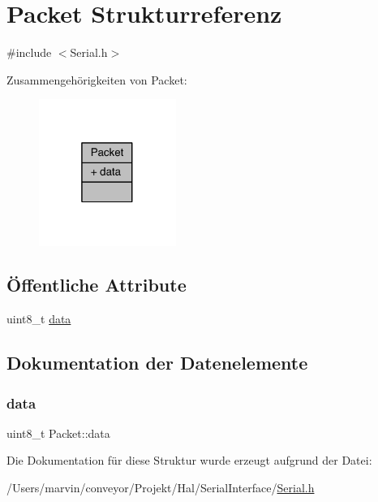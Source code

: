 \hypertarget{struct_packet}{}\section{Packet Strukturreferenz}
\label{struct_packet}


{\ttfamily \#include $<$Serial.\+h$>$}



Zusammengehörigkeiten von Packet\+:
\nopagebreak
\begin{figure}[H]
\begin{center}
\leavevmode
\includegraphics[width=127pt]{struct_packet__coll__graph}
\end{center}
\end{figure}
\subsection*{Öffentliche Attribute}
\begin{DoxyCompactItemize}
\item 
uint8\+\_\+t \hyperlink{struct_packet_a9c0a7fd8ec507914a389ed190ca3c51f}{data}
\end{DoxyCompactItemize}


\subsection{Dokumentation der Datenelemente}
\hypertarget{struct_packet_a9c0a7fd8ec507914a389ed190ca3c51f}{}\label{struct_packet_a9c0a7fd8ec507914a389ed190ca3c51f} 
\subsubsection{\texorpdfstring{data}{data}}
{\footnotesize\ttfamily uint8\+\_\+t Packet\+::data}



Die Dokumentation für diese Struktur wurde erzeugt aufgrund der Datei\+:\begin{DoxyCompactItemize}
\item 
/\+Users/marvin/conveyor/\+Projekt/\+Hal/\+Serial\+Interface/\hyperlink{_serial_8h}{Serial.\+h}\end{DoxyCompactItemize}
